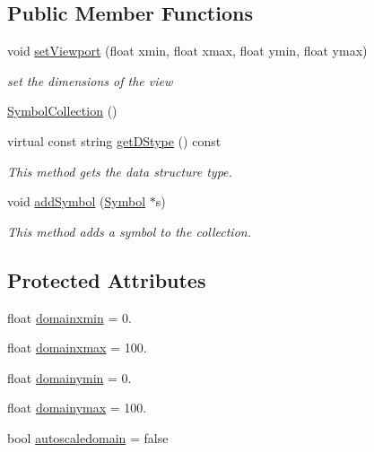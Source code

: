 \subsection*{Public Member Functions}
\begin{DoxyCompactItemize}
\item 
void \hyperlink{classbridges_1_1datastructure_1_1_symbol_collection_a8853f758e4e8ab7f9cef5bf4d0494027}{set\+Viewport} (float xmin, float xmax, float ymin, float ymax)
\begin{DoxyCompactList}\small\item\em set the dimensions of the view \end{DoxyCompactList}\item 
\hyperlink{classbridges_1_1datastructure_1_1_symbol_collection_aa8d074ecf235848f4253b19d6f5c7c74}{Symbol\+Collection} ()
\item 
virtual const string \hyperlink{classbridges_1_1datastructure_1_1_symbol_collection_a8f63c31a48a12127978967b706fc38f5}{get\+D\+Stype} () const
\begin{DoxyCompactList}\small\item\em This method gets the data structure type. \end{DoxyCompactList}\item 
void \hyperlink{classbridges_1_1datastructure_1_1_symbol_collection_aa569dc59920bf4cad706f44cd8492d52}{add\+Symbol} (\hyperlink{classbridges_1_1datastructure_1_1_symbol}{Symbol} $\ast$s)
\begin{DoxyCompactList}\small\item\em This method adds a symbol to the collection. \end{DoxyCompactList}\end{DoxyCompactItemize}
\subsection*{Protected Attributes}
\begin{DoxyCompactItemize}
\item 
float \hyperlink{classbridges_1_1datastructure_1_1_symbol_collection_a3db2f9c5d239e4ca964ea017a2beedac}{domainxmin} = 0.
\item 
float \hyperlink{classbridges_1_1datastructure_1_1_symbol_collection_a424f539a0a7cc48735f58978bb37249b}{domainxmax} = 100.
\item 
float \hyperlink{classbridges_1_1datastructure_1_1_symbol_collection_a2f08353c46444762f329bec94f087a2b}{domainymin} = 0.
\item 
float \hyperlink{classbridges_1_1datastructure_1_1_symbol_collection_a62b61a0ec9546c68f31a324ff6e6b518}{domainymax} = 100.
\item 
bool \hyperlink{classbridges_1_1datastructure_1_1_symbol_collection_a27dc0406085568b06244bcc0f8957f68}{autoscaledomain} = false
\end{DoxyCompactItemize}


